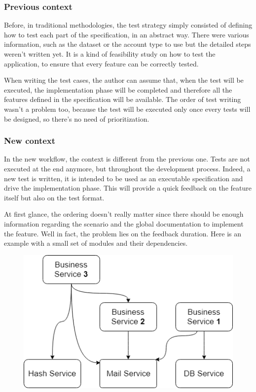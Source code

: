 \subsubsection{Previous context}
Before, in traditional methodologies, the test strategy simply consisted of
defining how to test each part of the specification, in an abstract way.
There were various information, such as the dataset or the account type to use
but the detailed steps weren't written yet.
It is a kind of feasibility study on how to test the application, to ensure
that every feature can be correctly tested.

When writing the test cases, the author can assume that, when the test will
be executed, the implementation phase will be completed and therefore all the
features defined in the specification will be available.
The order of test writing wasn't a problem too, because the test will be
executed only once every tests will be designed, so there's no need of
prioritization.

\subsubsection{New context}
In the new workflow, the context is different from the previous one.
Tests are not executed at the end anymore, but throughout the development
process.
Indeed, a new test is written, it is intended to be used as an executable
specification and drive the implementation phase.
This will provide a quick feedback on the feature itself but also on the test
format.

At first glance, the ordering doesn't really matter since there should be
enough information regarding the scenario and the global documentation to
implement the feature.
Well in fact, the problem lies on the feedback duration.
Here is an example with a small set of modules and their dependencies.

\begin{figure}
    \includegraphics[width=\textwidth]{../../resources/images/solution/module_dependencies.png}
    \centering
\end{figure}

